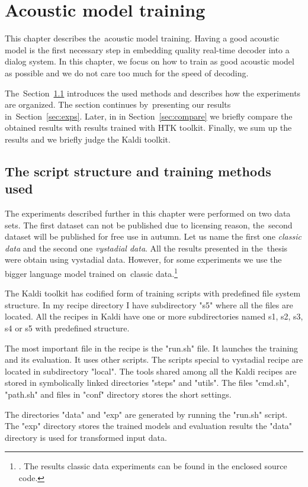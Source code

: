 \chapter{Acoustic model training}
\label{cha:training}

This chapter describes the~acoustic model training.
Having a good acoustic model is the first necessary step in embedding 
quality real-time decoder into a dialog system.
In this chapter, we focus on how to train as good acoustic model as possible
and we do not care too much for the speed of decoding.

The~Section~\ref{sec:setup} introduces the used methods and describes 
how the experiments are organized. The section continues by~presenting our results in~Section~\ref{sec:exps}. 
Later, in in Section~\ref{sec:compare} we briefly compare the obtained 
results with results trained with \ac{HTK} toolkit.
Finally, we sum up the results and we briefly judge the Kaldi toolkit.

\section{The script structure and training methods used} 
\label{sec:setup}

The experiments described further in this chapter were performed on two data sets.
The first dataset can not be published due to licensing reason, 
the~second dataset will be published for free use in autumn.
Let us name the first one {\it classic data} and the second one {\it vystadial data}.
All the results presented in the~thesis were obtain using vystadial data.
However, for some experiments we use the bigger language model trained 
on~classic data.\footnote{. The results classic data experiments 
can be found in the enclosed source code.}

\small{The Kaldi toolkit has codified form of training scripts with predefined file system structure. 
In my recipe directory I have subdirectory "s5" where all the files are located. All the recipes in Kaldi have 
 one or more subdirectories named s1, s2, s3, s4 or s5 with predefined structure.

The most important file in the recipe is the "run.sh" file. It launches the training and its evaluation.
It uses other scripts. The scripts special to vystadial recipe are located in subdirectory "local".
The tools shared among all the Kaldi recipes are stored in symbolically linked directories "steps" and "utils".
The files "cmd.sh", "path.sh" and files in "conf" directory stores the short settings.

The directories "data" and "exp" are generated by running the "run.sh" script.
The "exp" directory stores the trained models and evaluation results the "data" 
directory is used for transformed input data.}

